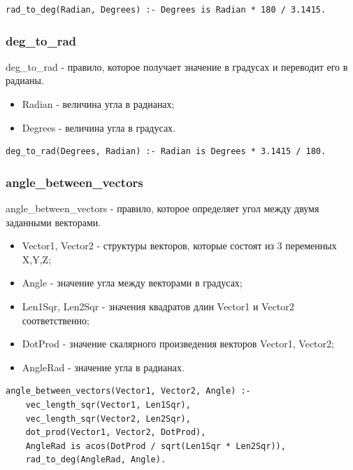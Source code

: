 \begin{lstlisting}[caption=Реализация правила rad\_to\_deg, label=rules:radtodeg]
rad_to_deg(Radian, Degrees) :- Degrees is Radian * 180 / 3.1415.
\end{lstlisting}
\subsubsection{deg\_to\_rad}
\hspace{0.6cm} deg\_to\_rad - правило, которое получает значение в градусах и переводит его в радианы.

\begin{itemize}
	\item Radian - величина угла в радианах;
	\item Degrees - величина угла в градусах.
\end{itemize}

\begin{lstlisting}[caption=Реализация правила deg\_to\_rad, label=rules:degtorad]
deg_to_rad(Degrees, Radian) :- Radian is Degrees * 3.1415 / 180.
\end{lstlisting}

\subsubsection{angle\_between\_vectors}
\hspace{0.6cm} angle\_between\_vectors - правило, которое определяет угол между двумя заданными векторами.

\begin{itemize}
	\item Vector1, Vector2 - структуры векторов, которые состоят из 3 переменных X,Y,Z;
	\item Angle - значение угла между векторами в градусах;
	\item Len1Sqr, Len2Sqr - значения квадратов длин Vector1 и Vector2 соответственно;
	\item DotProd - значение скалярного произведения векторов Vector1, Vector2;
	\item AngleRad - значение угла в радианах.
\end{itemize}

\begin{lstlisting}[caption=Реализация правила angle\_between\_vectors, label=rules:anglebetweenvectors]
angle_between_vectors(Vector1, Vector2, Angle) :-
	vec_length_sqr(Vector1, Len1Sqr),
	vec_length_sqr(Vector2, Len2Sqr),
	dot_prod(Vector1, Vector2, DotProd),
	AngleRad is acos(DotProd / sqrt(Len1Sqr * Len2Sqr)),
	rad_to_deg(AngleRad, Angle).
\end{lstlisting}

